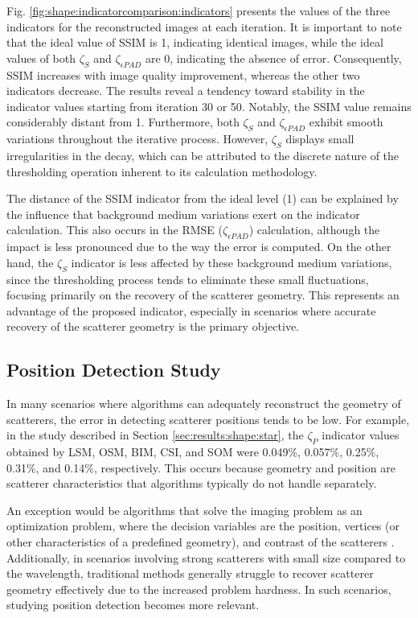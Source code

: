 \documentclass{ieeeaccess}
\begin{document}
            Fig. \ref{fig:shape:indicatorcomparison:indicators} presents the values of the three indicators for the reconstructed images at each iteration. It is important to note that the ideal value of SSIM is 1, indicating identical images, while the ideal values of both $\zeta_S$ and $\zeta_{\epsilon PAD}$ are 0, indicating the absence of error. Consequently, SSIM increases with image quality improvement, whereas the other two indicators decrease. The results reveal a tendency toward stability in the indicator values starting from iteration 30 or 50. Notably, the SSIM value remains considerably distant from 1. Furthermore, both $\zeta_S$ and $\zeta_{\epsilon PAD}$ exhibit smooth variations throughout the iterative process. However, $\zeta_S$ displays small irregularities in the decay, which can be attributed to the discrete nature of the thresholding operation inherent to its calculation methodology.

            The distance of the SSIM indicator from the ideal level (1) can be explained by the influence that background medium variations exert on the indicator calculation. This also occurs in the RMSE ($\zeta_{\epsilon PAD}$) calculation, although the impact is less pronounced due to the way the error is computed. On the other hand, the $\zeta_S$ indicator is less affected by these background medium variations, since the thresholding process tends to eliminate these small fluctuations, focusing primarily on the recovery of the scatterer geometry. This represents an advantage of the proposed indicator, especially in scenarios where accurate recovery of the scatterer geometry is the primary objective.

    \subsection{Position Detection Study}\label{sec:results:position}

        In many scenarios where algorithms can adequately reconstruct the geometry of scatterers, the error in detecting scatterer positions tends to be low. For example, in the study described in Section \ref{sec:results:shape:star}, the $\zeta_P$ indicator values obtained by LSM, OSM, BIM, CSI, and SOM were 0.049\%, 0.057\%, 0.25\%, 0.31\%, and 0.14\%, respectively. This occurs because geometry and position are scatterer characteristics that algorithms typically do not handle separately.

        An exception would be algorithms that solve the imaging problem as an optimization problem, where the decision variables are the position, vertices (or other characteristics of a predefined geometry), and contrast of the scatterers \cite{michalski2000electromagnetic,salucci2022learned,zardi2025physics}. Additionally, in scenarios involving strong scatterers with small size compared to the wavelength, traditional methods generally struggle to recover scatterer geometry effectively due to the increased problem hardness. In such scenarios, studying position detection becomes more relevant.
\end{document}
